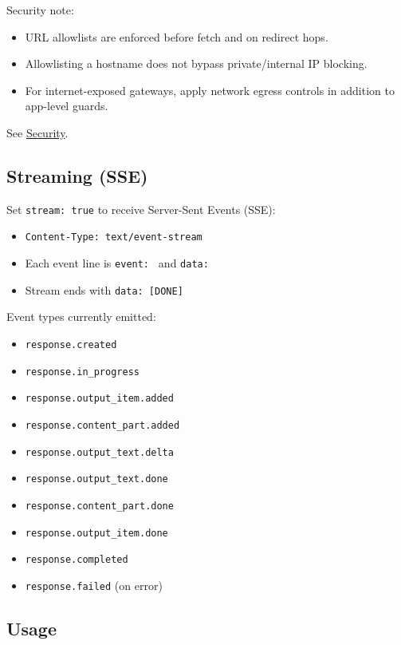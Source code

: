 Security note:

\begin{itemize}
  \item URL allowlists are enforced before fetch and on redirect hops.
  \item Allowlisting a hostname does not bypass private/internal IP blocking.
  \item For internet-exposed gateways, apply network egress controls in addition to app-level guards.
\end{itemize}

See \href{/gateway/security}{Security}.

\subsection{Streaming (SSE)}


Set \texttt{stream: true} to receive Server-Sent Events (SSE):

\begin{itemize}
  \item \texttt{Content-Type: text/event-stream}
  \item Each event line is \texttt{event: } and \texttt{data: }
  \item Stream ends with \texttt{data: [DONE]}
\end{itemize}


Event types currently emitted:

\begin{itemize}
  \item \texttt{response.created}
  \item \texttt{response.in\_progress}
  \item \texttt{response.output\_item.added}
  \item \texttt{response.content\_part.added}
  \item \texttt{response.output\_text.delta}
  \item \texttt{response.output\_text.done}
  \item \texttt{response.content\_part.done}
  \item \texttt{response.output\_item.done}
  \item \texttt{response.completed}
  \item \texttt{response.failed} (on error)
\end{itemize}


\subsection{Usage}


